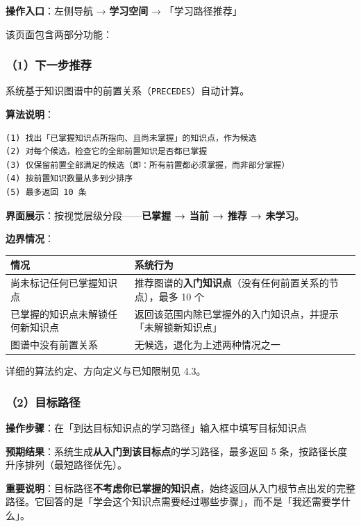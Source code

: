 \documentclass[UTF8,a4paper,11pt]{ctexrep}
\begin{document}
\textbf{操作入口}：左侧导航 → \textbf{学习空间} → 「学习路径推荐」

该页面包含两部分功能：


\subsubsection{（1）下一步推荐}

系统基于知识图谱中的前置关系（\texttt{PRECEDES}）自动计算。

\textbf{算法说明}：

\begin{Verbatim}[breaklines=true,breakanywhere=true,fontsize=\small,frame=single,framesep=4pt,rulecolor=\color{codeframe}]
(1) 找出「已掌握知识点所指向、且尚未掌握」的知识点，作为候选
(2) 对每个候选，检查它的全部前置知识是否都已掌握
(3) 仅保留前置全部满足的候选（即：所有前置都必须掌握，而非部分掌握）
(4) 按前置知识数量从多到少排序
(5) 最多返回 10 条
\end{Verbatim}

\textbf{界面展示}：按视觉层级分段——\textbf{已掌握 → 当前 → 推荐 → 未学习}。

\textbf{边界情况}：

\begin{center}
\small
\begin{tabularx}{\linewidth}{@{}XX@{}}
\toprule
情况 & 系统行为 \\
\midrule
尚未标记任何已掌握知识点 & 推荐图谱的\textbf{入门知识点}（没有任何前置关系的节点），最多 10 个 \\
已掌握的知识点未解锁任何新知识点 & 返回该范围内除已掌握外的入门知识点，并提示「未解锁新知识点」 \\
图谱中没有前置关系 & 无候选，退化为上述两种情况之一 \\
\bottomrule
\end{tabularx}
\end{center}
详细的算法约定、方向定义与已知限制见 4.3。


\subsubsection{（2）目标路径}

\textbf{操作步骤}：在「到达目标知识点的学习路径」输入框中填写目标知识点

\textbf{预期结果}：系统生成\textbf{从入门到该目标点}的学习路径，最多返回 5 条，按路径长度升序排列（最短路径优先）。

\begin{notebox}
\textbf{重要说明}：目标路径\textbf{不考虑你已掌握的知识点}，始终返回从入门根节点出发的完整路径。它回答的是「学会这个知识点需要经过哪些步骤」，而不是「我还需要学什么」。

\end{notebox}
\end{document}

